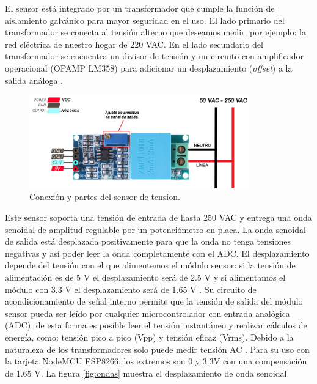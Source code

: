 \begin{enumerate}
El sensor está integrado por un transformador que cumple la función de aislamiento galvánico para mayor seguridad en el uso. El lado primario del transformador se conecta al tensión alterno que deseamos medir, por ejemplo: la red eléctrica de nuestro hogar de 220 VAC. En el lado secundario del transformador se encuentra un divisor de tensión y un circuito con amplificador operacional (OPAMP LM358) para adicionar un desplazamiento (\emph{offset}) a la salida análoga \citep{WEBSITE:22}. 

\begin{figure}[htpb]
\centering 
\includegraphics[width=0.85\textwidth]{./Figures/sensortension.png}
\caption{Conexión y partes del sensor de tension.}
\label{fig:sensortension}
\end{figure}


Este sensor soporta una tensión de entrada de hasta 250 VAC y entrega una onda senoidal de amplitud regulable por un potenciómetro en placa. La onda senoidal de salida está desplazada positivamente para que la onda no tenga tensiones negativas y así poder leer la onda completamente con el ADC. El desplazamiento depende del tensión con el que alimentemos el módulo sensor: si la tensión de alimentación es de 5 V el desplazamiento será de 2.5 V y si alimentamos el módulo con 3.3 V el desplazamiento será de 1.65 V \citep{WEBSITE:23}. Su circuito de acondicionamiento de señal interno permite que la tensión de salida del módulo sensor pueda ser leído por cualquier microcontrolador con entrada analógica (ADC), de esta forma es posible leer el tensión instantáneo y realizar cálculos de energía, como: tensión pico a pico (Vpp) y tensión eficaz (Vrms). Debido a la naturaleza de los transformadores solo puede medir tensión AC \citep{WEBSITE:22} \citep{ARTICLE:1}. Para su uso con la tarjeta NodeMCU ESP8266, los extremos son 0 y 3.3V con una compensación de 1.65 V. La figura \ref{fig:ondas} muestra el desplazamiento de onda senoidal



\end{enumerate}
